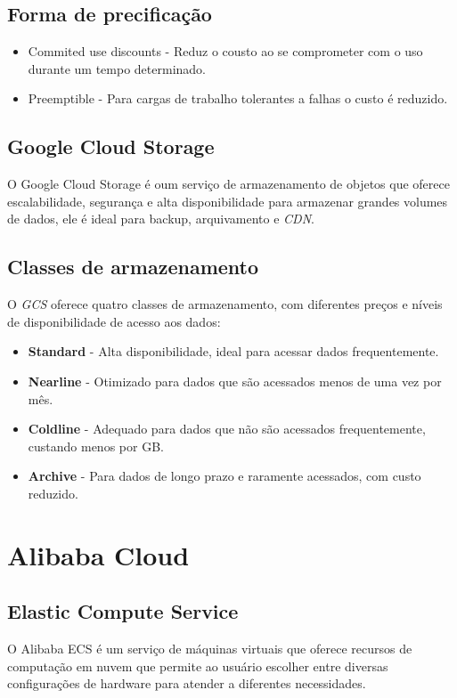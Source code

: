 \documentclass[a4paper,12pt]{article}
\begin{document}
\subsection*{Forma de precificação}

\begin{itemize}
  \item Commited use discounts - Reduz o cousto ao se comprometer com o uso durante um tempo determinado.
  \item Preemptible - Para cargas de trabalho tolerantes a falhas o custo é reduzido.
  \end{itemize}

\subsection*{Google Cloud Storage}
O Google Cloud Storage é oum serviço de armazenamento de objetos que oferece escalabilidade, segurança e alta disponibilidade para armazenar grandes volumes de dados, ele é ideal para backup, arquivamento e \textit{CDN}.
\subsection*{Classes de armazenamento}
O \textit{GCS} oferece quatro classes de armazenamento, com diferentes preços e níveis de disponibilidade de acesso aos dados:
\begin{itemize}
  \item\textbf{Standard} - Alta disponibilidade, ideal para acessar dados frequentemente.
  \item\textbf{Nearline} - Otimizado para dados que são acessados menos de uma vez por mês. 
  \item\textbf{Coldline} - Adequado para dados que não são acessados frequentemente, custando menos por GB.
  \item\textbf{Archive} - Para dados de longo prazo e raramente acessados, com custo reduzido.
\end{itemize}
\break

\section*{Alibaba Cloud}

\subsection*{Elastic Compute Service}
O Alibaba ECS é um serviço de máquinas virtuais que oferece recursos de computação em nuvem que permite ao usuário escolher entre diversas configurações de hardware para atender a diferentes necessidades.
\end{document}
